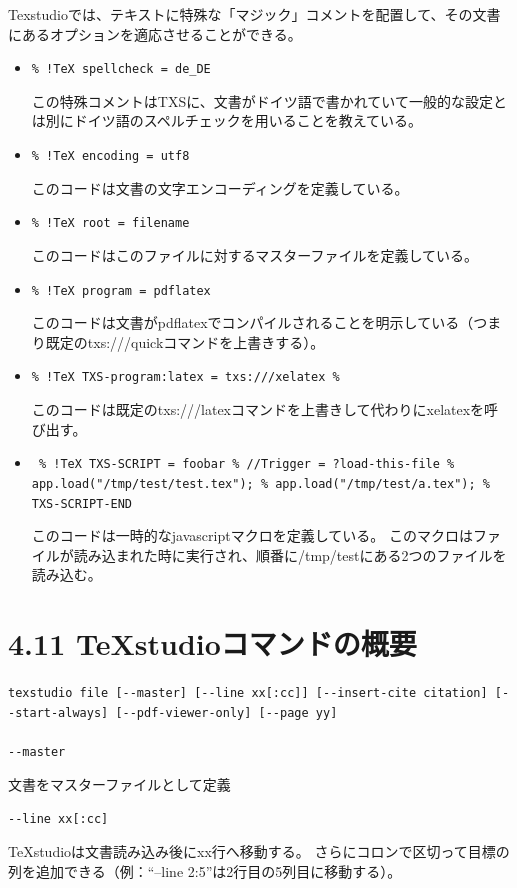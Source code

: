 \documentclass[]{book}
\begin{document}
Texstudioでは、テキストに特殊な「マジック」コメントを配置して、その文書にあるオプションを適応させることができる。

\begin{itemize}
\item
  \lstinline"% !TeX spellcheck = de_DE"

  この特殊コメントはTXSに、文書がドイツ語で書かれていて一般的な設定とは別にドイツ語のスペルチェックを用いることを教えている。
\item
  \lstinline"% !TeX encoding = utf8"

  このコードは文書の文字エンコーディングを定義している。
\item
  \lstinline"% !TeX root = filename"

  このコードはこのファイルに対するマスターファイルを定義している。
\item
  \lstinline"% !TeX program = pdflatex"

  このコードは文書がpdflatexでコンパイルされることを明示している（つまり既定のtxs:///quickコマンドを上書きする）。
\item
  \lstinline"% !TeX TXS-program:latex = txs:///xelatex %"

  このコードは既定のtxs:///latexコマンドを上書きして代わりにxelatexを呼び出す。
\item
  \lstinline# % !TeX TXS-SCRIPT = foobar % //Trigger = ?load-this-file % app.load("/tmp/test/test.tex"); % app.load("/tmp/test/a.tex"); % TXS-SCRIPT-END     #

  このコードは一時的なjavascriptマクロを定義している。
  このマクロはファイルが読み込まれた時に実行され、順番に/tmp/testにある2つのファイルを読み込む。
\end{itemize}

\section{4.11 TeXstudioコマンドの概要}

\lstinline!texstudio file [--master] [--line xx[:cc]] [--insert-cite citation] [--start-always] [--pdf-viewer-only] [--page yy]!\\\\

\lstinline!--master!

文書をマスターファイルとして定義

\lstinline!--line xx[:cc]!

TeXstudioは文書読み込み後にxx行へ移動する。
さらにコロンで区切って目標の列を追加できる（例：``--line
2:5''は2行目の5列目に移動する）。
\end{document}

